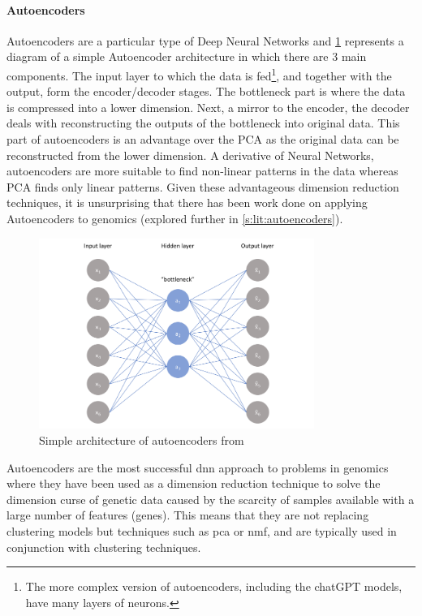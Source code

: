 \paragraph*{Autoencoders} \label{s:lit:autoencod_overview}

Autoencoders are a particular type of Deep Neural Networks and \cref{fig:autoencoders} represents a diagram of a simple Autoencoder architecture in which there are 3 main components. The input layer to which the data is fed\footnote{The more complex version of autoencoders, including the chatGPT models, have many layers of neurons.}, and together with the output, form the encoder/decoder stages. The bottleneck part is where the data is compressed into a lower dimension. Next, a mirror to the encoder, the decoder deals with reconstructing the outputs of the bottleneck into original data. This part of autoencoders is an advantage over the PCA as the original data can be reconstructed from the lower dimension. A derivative of Neural Networks, autoencoders are more suitable to find non-linear patterns in the data whereas PCA finds only linear patterns. Given these advantageous dimension reduction techniques, it is unsurprising that there has been work done on applying Autoencoders to genomics (explored further in \cref{s:lit:autoencoders}).

\begin{figure}[!htb]
  \centering\includegraphics[width=0.8\textwidth,height=0.5\textheight,keepaspectratio]{Sections/Lit_review/Resources/simple_autoencoders.png}
    \caption{Simple architecture of autoencoders from \cite{Jordan2018-bc}}
    \label{fig:autoencoders}
\end{figure}
\FloatBarrier



Autoencoders are the most successful \acrshort{dnn} approach to problems in genomics where they have been used as a dimension reduction technique to solve the dimension curse of genetic data caused by the scarcity of samples available with a large number of features (genes). This means that they are not replacing clustering models but techniques such as \acrfull{pca} or \acrfull{nmf}, and are typically used in conjunction with clustering techniques.
